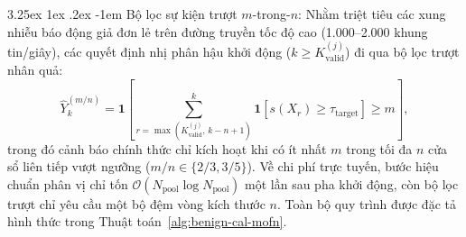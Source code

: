 \documentclass[12pt, a4paper, reqno, oneside]{book}
\makeatletter
\renewcommand\paragraph{\@startsection{paragraph}{5}{\z@}%
  {3.25ex \@plus1ex \@minus.2ex}%
  {-1em}%
  {\normalfont\normalsize\bfseries}}
\makeatother
\begin{document}
\paragraph{Bộ lọc sự kiện trượt $m$-trong-$n$:} Nhằm triệt tiêu các xung nhiễu báo động giả đơn lẻ trên đường truyền tốc độ cao (1.000--2.000 khung tin/giây), các quyết định nhị phân hậu khởi động ($k \ge K_{\text{valid}}^{(j)}$) đi qua bộ lọc trượt nhân quả:
\begin{equation}\label{eq:mofn-filter}
\hat{Y}_k^{(m/n)} = \mathbf{1}\!\left[\sum_{r = \max(K_{\text{valid}}^{(j)},\, k - n + 1)}^{k} \mathbf{1}\!\left[s(X_r) \ge \tau_{\text{target}}\right] \ge m\right],
\end{equation}
trong đó cảnh báo chính thức chỉ kích hoạt khi có ít nhất $m$ trong tối đa $n$ cửa sổ liên tiếp vượt ngưỡng ($m/n \in \{2/3, 3/5\}$). Về chi phí trực tuyến, bước hiệu chuẩn phân vị chỉ tốn $\mathcal{O}(N_{\text{pool}} \log N_{\text{pool}})$ một lần sau pha khởi động, còn bộ lọc trượt chỉ yêu cầu một bộ đệm vòng kích thước $n$. Toàn bộ quy trình được đặc tả hình thức trong Thuật toán~\ref{alg:benign-cal-mofn}.
\end{document}
